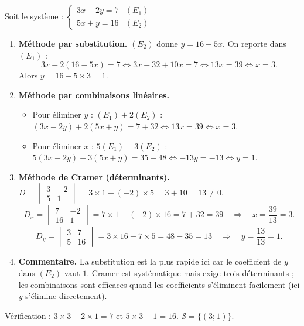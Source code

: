 \documentclass[11pt]{article}
\begin{document}
\begin{corrige}
Soit le système : $\begin{cases} 3x - 2y = 7 & (E_1) \\ 5x + y = 16 & (E_2) \end{cases}$

\begin{enumerate}
\item \textbf{Méthode par substitution.} $(E_2)$ donne $y = 16 - 5x$. On reporte dans $(E_1)$ :
\[ 3x - 2(16 - 5x) = 7 \iff 3x - 32 + 10x = 7 \iff 13x = 39 \iff x = 3. \]
Alors $y = 16 - 5\times 3 = 1$.
\item \textbf{Méthode par combinaisons linéaires.}
\begin{itemize}
\item Pour éliminer $y$ : $(E_1) + 2(E_2)$ : $(3x-2y) + 2(5x+y) = 7 + 32 \iff 13x = 39 \iff x = 3$.
\item Pour éliminer $x$ : $5(E_1) - 3(E_2)$ : $5(3x-2y) - 3(5x+y) = 35 - 48 \iff -13y = -13 \iff y = 1$.
\end{itemize}
\item \textbf{Méthode de Cramer (déterminants).}
$D = \begin{vmatrix} 3 & -2 \\ 5 & 1 \end{vmatrix} = 3\times 1 - (-2)\times 5 = 3 + 10 = 13 \neq 0$.
\[ D_x = \begin{vmatrix} 7 & -2 \\ 16 & 1 \end{vmatrix} = 7\times 1 - (-2)\times 16 = 7 + 32 = 39 \quad\Rightarrow\quad x = \frac{39}{13} = 3. \]
\[ D_y = \begin{vmatrix} 3 & 7 \\ 5 & 16 \end{vmatrix} = 3\times 16 - 7\times 5 = 48 - 35 = 13 \quad\Rightarrow\quad y = \frac{13}{13} = 1. \]
\item \textbf{Commentaire.} La substitution est la plus rapide ici car le coefficient de $y$ dans $(E_2)$ vaut $1$. Cramer est systématique mais exige trois déterminants ; les combinaisons sont efficaces quand les coefficients s'éliminent facilement (ici $y$ s'élimine directement).
\end{enumerate}
Vérification : $3\times 3 - 2\times 1 = 7$ et $5\times 3 + 1 = 16$. $\mathcal{S} = \{(3 ; 1)\}$.
\end{corrige}
\end{document}
